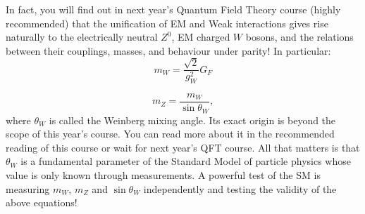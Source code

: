\begin{center}

\end{center}

In fact, you will find out in next year's Quantum Field Theory course (highly recommended) that the unification of EM and Weak interactions gives rise naturally to the electrically neutral $Z^0$, EM charged $W$ bosons, and the relations between their couplings, masses, and behaviour under parity! In particular:
\[
m_W=\frac{\sqrt{2}}{g_{W}^{2}}{G_F}
\]

\[
m_Z = \frac{m_W}{\sin\theta_W},
\]
where $\theta_W$ is called the Weinberg mixing angle. Its exact origin is beyond the scope of this year's course. You can read more about it in the recommended reading of this course or wait for next year's QFT course. All that matters is that $\theta_W$ is a fundamental parameter of the Standard Model of particle physics whose value is only known through measurements. A powerful test of the SM is measuring $m_W$, $m_Z$ and $\sin\theta_W$ independently and testing the validity of the above equations!

